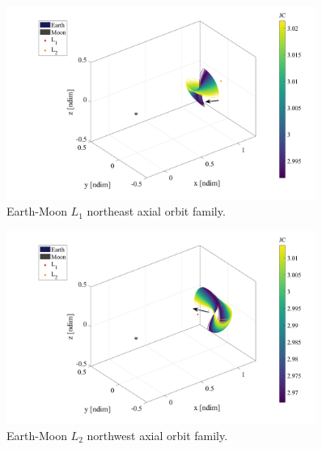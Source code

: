 \begin{figure}[ht]
    \centering
    \includegraphics[width=0.9\textwidth]{figures/L1AxialFamily.pdf}
    \caption{Earth-Moon $L_{1}$ northeast axial orbit family.}
    \label{fig:L1Axial}
\end{figure}

\begin{figure}[ht]
    \centering
    \includegraphics[width=0.9\textwidth]{figures/L2AxialFamily.pdf}
    \caption{Earth-Moon $L_{2}$ northwest axial orbit family.}
    \label{fig:L2Axial}
\end{figure}

